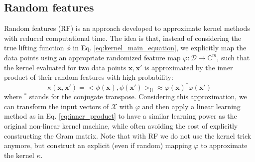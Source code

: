 \subsection{Random features}
Random features (RF) \citep{rahimi2008random} is an approach developed to approximate kernel methods with reduced computational time. The idea is that, instead of considering the true lifting function $\phi$ in Eq. \ref{eq:kernel_main_equation}, we explicitly map the data points using an appropriate randomized feature map $\varphi:\mathcal{D} \xrightarrow{}\mathbb{C}^m$, such that the kernel evaluated for two data points $\mathbf{x}, \mathbf{x}'$ is approximated by the inner product of their random features with high probability:
\begin{equation}
\label{eq:approx_RF}
\kappa(\mathbf{x},\mathbf{x}')=<\phi(\mathbf{x}),\phi(\mathbf{x}')>_\mathbb{H} \approx \varphi(\mathbf{x})^*\varphi(\mathbf{x}')
\end{equation}
where $^*$ stands for the conjugate transpose. 
Considering this approximation, we can transform the input vectors of $\mathcal{X}$ with $\varphi$ and then apply a linear learning method as in Eq. \ref{eq:inner_product} to have a similar learning power as the original non-linear kernel machine, while often avoiding the cost of explicitly constructing the Gram matrix. Note that with RF we do not use the kernel trick anymore, but construct an explicit (even if random) mapping $\varphi$ to approximate the kernel $\kappa$.

